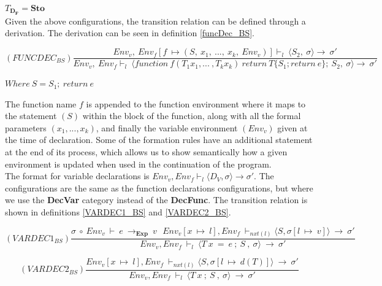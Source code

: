 $T_{\mathbf{D_F}} = \textbf{Sto}$ \\

\noindent Given the above configurations, the transition relation can be defined through a derivation. The derivation can be seen in definition \ref{funcDec_BS}.

\begin{equation} \label{funcDec_BS}
    (FUNCDEC_{BS})\frac{Env_v, \ Env_f[f \ \mapsto  (S, \ x_1, \ ..., \ x_k, \ Env_v)] \vdash _l \ \langle S_2, \ \sigma \rangle \rightarrow \ \sigma' }{Env_v, \  Env_f \vdash _l \ \langle function \ f(T_1 x_1, ... \ , T_k x_k) 
\ return \ T \{ S_1 ; return \ e\} ; \ S_2 , \ \sigma \rangle \rightarrow \ \sigma'}
\end{equation} 
\begin{center}
    $Where \ S = S_1 ; \ return \ e$
\end{center}

\noindent The function name $f$ is appended to the function environment where it maps to the statement $(S)$ within the block of the function, along with all the formal parameters $(x_1, ..., x_k)$, and finally the variable environment $(Env_v)$ given at the time of declaration. Some of the formation rules have an additional statement at the end of its process, which allows us to show semantically how a given environment is updated when used in the continuation of the program. \\

The format for variable declarations is $Env_v, Env_f \vdash _l \langle D_V, \sigma \rangle \rightarrow \sigma' $. The configurations are the same as the function declarations configurations, but where we use the \textbf{DecVar} category instead of the \textbf{DecFunc}. The transition relation is shown in definitions \ref{VARDEC1_BS} and \ref{VARDEC2_BS}.

\begin{equation} \label{VARDEC1_BS}
    (VARDEC1_{BS})\frac{\sigma \ \circ \ Env_v \ \vdash \ e \ \rightarrow _{\textbf{Exp}} \ v \ \ \ Env_v[x \ \mapsto \ l], Env_f \ \vdash _{nxt(l)} \langle S, \sigma[l \ \mapsto \ v] \rangle \ \rightarrow \ \sigma'}
    {Env_v, Env_f \ \vdash _l \ \langle T \ x \ = \ e \ ; \  S \ , \ \sigma \rangle \ \rightarrow \ \sigma'}
\end{equation}

\begin{equation} \label{VARDEC2_BS}
    (VARDEC2_{BS})\frac{Env_v[x \ \mapsto \ l], Env_f \ \vdash _{nxt(l)} \langle S, \sigma[l \ \mapsto \ d(T)] \rangle \ \rightarrow \ \sigma'}
    {Env_v, Env_f \ \vdash _l \ \langle T \ x \ ; \  S \ , \ \sigma \rangle \ \rightarrow \ \sigma'}
\end{equation}

